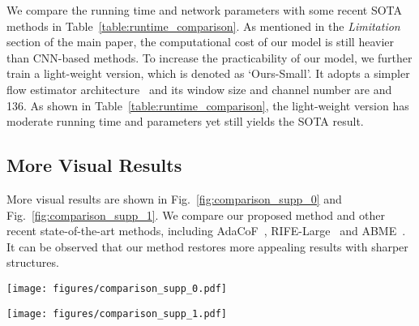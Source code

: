 \documentclass[10pt,twocolumn,letterpaper]{article}
\begin{document}
	We compare the running time and network parameters with some recent SOTA methods in Table~\ref{table:runtime_comparison}.
	As mentioned in the \textit{Limitation} section of the main paper, the computational cost of our model is still heavier than CNN-based methods. To increase the practicability of our model, we further train a light-weight version, which is denoted as `Ours-Small'. It adopts a simpler flow estimator architecture~\cite{rife} and its window size and channel number are  and 136. As shown in Table~\ref{table:runtime_comparison}, the light-weight version has moderate running time and parameters yet still yields the SOTA result.
	
	
	


	\subsection{More Visual Results}
	
	More visual results are shown in Fig.~\ref{fig:comparison_supp_0} and Fig.~\ref{fig:comparison_supp_1}.
	We compare our proposed method and other recent state-of-the-art methods, including AdaCoF~\cite{lee2020adacof}, RIFE-Large~\cite{rife} and ABME~\cite{asymmetric}. It can be observed that our method restores more appealing results with sharper structures. 


	
	
	\begin{figure*}[t]
		\begin{center}
\texttt{[image: figures/comparison\_supp\_0.pdf]}
		\end{center}
		\vspace{-0.15in}
		\caption{Visual comparison among different VFI methods on the Vimeo90K~\cite{vimeo90k} testing set.}
		\label{fig:comparison_supp_0}
\end{figure*}
	
	
	\begin{figure*}[t]
		\begin{center}
\texttt{[image: figures/comparison\_supp\_1.pdf]}
		\end{center}
		\vspace{-0.15in}
		\caption{Visual comparison among different VFI methods on the Vimeo90K~\cite{vimeo90k} testing set.}
		\label{fig:comparison_supp_1}
\end{figure*}
	





	
\end{document}

